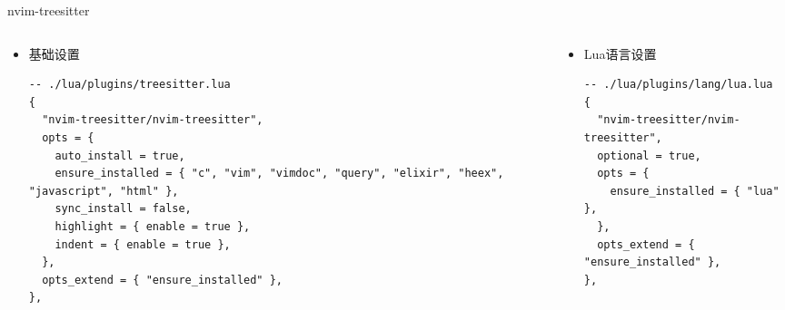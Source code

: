\documentclass[aspectratio=169]{ctexbeamer}
\begin{document}
\begin{frame}[fragile]{nvim-treesitter}
  \begin{columns}
    \begin{column}[t]{0.5\linewidth}
      \begin{itemize}
        \item 基础设置
          \begin{lstlisting}[basicstyle=\tiny\ttfamily]
-- ./lua/plugins/treesitter.lua
{
  "nvim-treesitter/nvim-treesitter",
  opts = {
    auto_install = true,
    ensure_installed = { "c", "vim", "vimdoc", "query", "elixir", "heex", "javascript", "html" },
    sync_install = false,
    highlight = { enable = true },
    indent = { enable = true },
  },
  opts_extend = { "ensure_installed" },
},
          \end{lstlisting}
      \end{itemize}
    \end{column}

    \begin{column}[t]{0.5\linewidth}
      \begin{itemize}
        \item Lua语言设置
          \begin{lstlisting}[basicstyle=\tiny\ttfamily]
-- ./lua/plugins/lang/lua.lua
{
  "nvim-treesitter/nvim-treesitter",
  optional = true,
  opts = {
    ensure_installed = { "lua" },
  },
  opts_extend = { "ensure_installed" },
},
          \end{lstlisting}
      \end{itemize}
    \end{column}
  \end{columns}
\end{frame}
\end{document}
